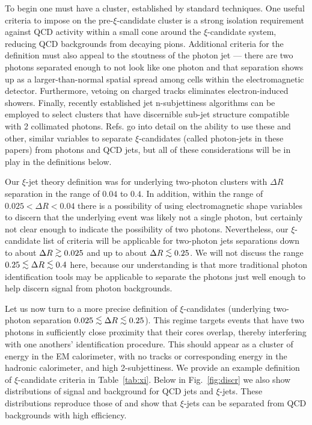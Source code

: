 \documentclass[letter,12pt]{article}
\newcommand{\gsim}{\lower.7ex\hbox{$\;\stackrel{\textstyle>}{\sim}\;$}}
\newcommand{\lsim}{\lower.7ex\hbox{$\;\stackrel{\textstyle<}{\sim}\;$}}
\begin{document}
To begin one must have a cluster, established by standard techniques. One useful criteria to impose on the pre-$\xi$-candidate cluster is a strong isolation requirement against QCD activity within a small cone around the $\xi$-candidate system, reducing QCD backgrounds from decaying pions. Additional criteria for the definition must also appeal to the stoutness of the photon jet --- there are two photons separated enough to not look like one photon and that separation shows up as a larger-than-normal spatial spread among cells within the electromagnetic detector.  Furthermore, vetoing on charged tracks eliminates electron-induced showers. Finally, recently established jet n-subjettiness algorithms\cite{Thaler:2010tr} can be employed to select clusters that have discernible sub-jet structure compatible with 2 collimated photons. Refs.\cite{photon_jets,chakraborty_framework_2018} go into detail on the ability to use these and other, similar variables to separate $\xi$-candidates (called photon-jets in these papers) from photons and QCD jets, but all of these considerations will be in play in the definitions below.

Our $\xi$-jet theory definition was for underlying two-photon clusters with $\Delta R$ separation in the range of $0.04$ to $0.4$. In addition, within the range of $0.025<\Delta R<0.04$ there is a possibility of using electromagnetic shape variables to discern that the underlying event was likely not a single photon, but certainly not clear enough to indicate the possibility of two photons. Nevertheless, our $\xi$-candidate list of criteria will be applicable for two-photon jets separations down to about $\Delta R\gsim 0.025$ and up to about $\Delta R \lsim 0.25$. We will not discuss the range $0.25\lsim \Delta R\lsim 0.4$ here, because our understanding is that more traditional photon identification tools may be applicable to separate the photons just well enough to help discern signal from photon backgrounds.

Let us now turn to a more precise definition of $\xi$-candidates (underlying two-photon separation $0.025\lsim \Delta R\lsim 0.25$). This regime targets events that have two photons in sufficiently close proximity that their cores overlap, thereby interfering with one anothers' identification procedure. This should appear as a cluster of energy in the EM calorimeter, with no tracks or corresponding energy in the hadronic calorimeter, and high 2-subjettiness. We provide an example definition of $\xi$-candidate criteria in Table~\ref{tab:xi}. Below in Fig.~\ref{fig:discr} we also show distributions of signal and background for QCD jets and $\xi$-jets. These distributions reproduce those of \cite{chakraborty_framework_2018,photon_jets} and show that $\xi$-jets can be separated from QCD backgrounds with high efficiency. 
\end{document}
